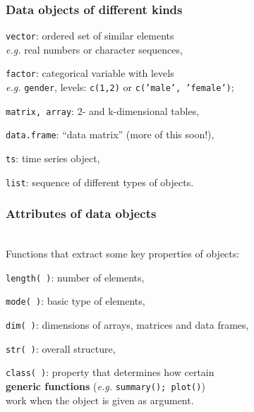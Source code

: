 \documentclass[handout,12pt]{beamer}
\begin{document}
\begin{frame}\frametitle{Data objects of different kinds}

\bi
\item {\tt vector}: ordered set of similar elements \\ \emph{e.g.}
  real numbers or character sequences,
  \pause\medskip
\item {\tt factor}: categorical variable with levels \\ 
\emph{e.g.}
{\tt gender}, levels: {\tt c(1,2)} or {\tt c('male', 'female')}; 
\pause\medskip
\item {\tt matrix, array}: 2- and k-dimensional tables,
\pause\medskip
\item {\tt data.frame}: ``data matrix'' (more of this soon!),
\pause\medskip
\item {\tt ts}: time series object,
\pause\medskip
\item {\tt list}: sequence of different types of objects.
\ei
\end{frame}


\begin{frame}\frametitle{Attributes of data objects}
\ \\
Functions that extract some key properties
of objects:
\bi 
\item {\tt length( )}: number of elements, 
\pause\medskip
\item {\tt mode( )}: basic type of elements, 
\pause\medskip
\item {\tt dim( )}: dimensions of arrays, matrices
   and data frames,
  \pause\medskip 
\item {\tt str( )}: overall structure, 
\pause\medskip
\item {\tt class( )}: property that determines
 how certain \\
 {\bf generic functions} (\emph{e.g.} 
 {\tt summary(); plot()}) \\
 work when the object is given as argument.
\ei
\end{frame}
\end{document}
